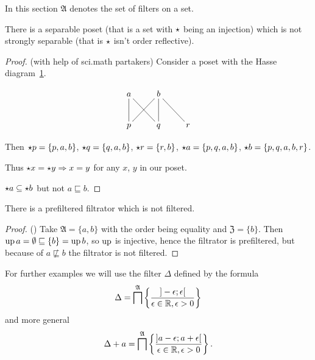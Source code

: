 In this section $\mathfrak{A}$ denotes the set of filters on a set.
\begin{example}
There is a separable poset (that is a set with $\star$ being
an injection) which is not strongly separable (that is $\star$ isn't order reflective).\end{example}
\begin{proof}
(with help of sci.math partakers) Consider a poset with the Hasse
diagram~\ref{sep-counter}.

\begin{figure}[ht]
\[
\xymatrix{a\ar@{-}[d]\ar@{-}[dr] & b\ar@{-}[dl]\ar@{-}[d]\ar@{-}[dr]\\
p & q & r
}
\]
\caption{\label{sep-counter}}
\end{figure}


Then $\star p=\{p,a,b\}$, $\star q=\{q,a,b\}$, $\star r=\{r,b\}$,
$\star a=\{p,q,a,b\}$, $\star b=\{p,q,a,b,r\}$.

Thus $\star x=\star y\Rightarrow x=y$ for any $x$, $y$
in our poset.

$\star a\subseteq\star b$ but not $a\sqsubseteq b$.\end{proof}
\begin{example}
There is a prefiltered filtrator which is not filtered.\end{example}
\begin{proof}
() Take $\mathfrak{A}=\{a,b\}$ with the order
being equality and $\mathfrak{Z}=\{b\}$. Then $\operatorname{up} a=\emptyset\sqsubseteq\{b\}=\operatorname{up} b$,
so $\operatorname{up}$ is injective, hence the filtrator is prefiltered, but because
of $a\nsqsubseteq b$ the filtrator is not filtered.
\end{proof}
For further examples we will use the filter $\Delta$ defined by the
formula
\[
\Delta=\bigsqcap^{\mathfrak{A}}\left\{ \frac{]-\epsilon;\epsilon[}{\epsilon\in\mathbb{R},\epsilon>0}\right\}
\]
and more general
\[
\Delta+a=\bigsqcap^{\mathfrak{A}}\left\{ \frac{]a-\epsilon;a+\epsilon[}{\epsilon\in\mathbb{R},\epsilon>0}\right\}.
\]

